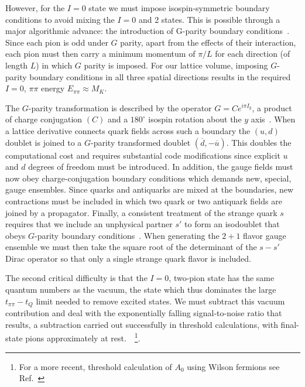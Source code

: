 \documentclass[aps,prl,
superscriptaddress,
showpacs,
preprintnumbers,
bibnotes,
amsmath,
amssymb,
twocolumn,
floatfix,
]{revtex4-1}
\begin{document}
However, for the $I=0$ state we must impose isospin-symmetric boundary conditions to avoid mixing the $I=0$ and 2 states.   This is possible through a major algorithmic advance: the introduction of G-parity boundary conditions~\cite{Kim:2002np, Wiese:1991ku}.  Since each pion is odd under $G$ parity, apart from the effects of their interaction, each pion must then carry a minimum momentum of $\pi/L$ for each direction (of length $L$) in which $G$ parity is imposed.  For our lattice volume, imposing $G$-parity boundary conditions in all three spatial directions results in the required $I=0$, $\pi\pi$ energy $E_{\pi\pi} \approx M_K$.

The $G$-parity transformation is described by the operator $G=Ce^{i\pi I_y}$, a product of charge conjugation $(C)$ and a $180^\circ$ isospin rotation about the $y$ axis~\cite{Lee:1956sw}.  When a lattice derivative connects quark fields across such a boundary the $(u, d)$ doublet is joined to a $G$-parity transformed doublet $(\overline{d}, -\overline{u})$.  This doubles the computational cost and requires substantial code modifications since explicit $u$ and $d$ degrees of freedom must be introduced.  In addition, the gauge fields must now obey charge-conjugation boundary conditions which demands new, special, gauge ensembles.  Since quarks and antiquarks are mixed at the boundaries, new contractions must be included in which two quark or two antiquark fields are joined by a propagator. Finally, a consistent treatment of the strange quark $s$ requires that we include an unphysical partner $s'$ to form an isodoublet that obeys $G$-parity boundary conditions~\cite{Kim:2009fe}.  When generating the $2+1$ flavor gauge ensemble we must then take the square root of the determinant of the $s-s'$ Dirac operator so that only a single strange quark flavor is included.

The second critical difficulty is that the $I=0$, two-pion state has the same quantum numbers as the vacuum, the state which thus dominates the large $t_{\pi\pi}-t_Q$ limit needed to remove excited states.  We must subtract this vacuum contribution and deal with the exponentially falling signal-to-noise ratio that results, a subtraction carried out successfully in threshold calculations, with final-state pions approximately at rest.~\cite{Blum:2011pu, QLiu_thesis}~\footnote{For a more recent, threshold calculation of $A_0$ using Wilson fermions see Ref.~\cite{Ishizuka:2015oja}}.
\end{document}
